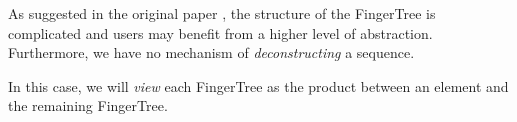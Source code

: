 \documentclass[12pt,twoside,notitlepage]{report}
\begin{document}
As suggested in the original paper \cite{fingertrees}, the structure of the FingerTree is complicated and users may benefit from a higher level of abstraction. Furthermore, we have no mechanism of \textit{deconstructing} a sequence.

In this case, we will \textit{view}\cite{wadler} each FingerTree as the product between an element and the remaining FingerTree. 

\begin{code}
\\
\\
\>  \AgdaSymbol{\{}\AgdaSymbol{\}(} \AgdaSymbol{:}  \AgdaSymbol{)(} \AgdaSymbol{:}  \AgdaSymbol{)}\<%
\\
\>[8]\<[10]%
\>[10]  \AgdaSymbol{:}   \<%
\\
\>[8]\<[10]%
\>[10]  \AgdaSymbol{:}     \AgdaSymbol{:}\<%
\\
\>[8]\<[10]%
\>[10]\AgdaSymbol{\{} \AgdaSymbol{:} \AgdaSymbol{\}}    \<%
\\
\>[0]\<[2]%
\>[2] \AgdaSymbol{:} \<[10]%
\>[10]   \AgdaSymbol{\{}\AgdaSymbol{\}}\<%
\\
\>[0]\<[2]%
\>[2] \AgdaSymbol{:}  \AgdaSymbol{\{}\AgdaSymbol{\}}\<%
\\
\>[2]\<[10]%
\>[10]\AgdaSymbol{(} \AgdaSymbol{:} \AgdaSymbol{)}\<%
\\
\>[2]\<[10]%
\>[10] \AgdaSymbol{(} \AgdaSymbol{:}    \AgdaSymbol{\{}\AgdaSymbol{\})}\<%
\\
\>[2]\<[10]%
\>[10]    \AgdaSymbol{\{}    \AgdaSymbol{\}}\<%
\\
\end{code} 
\end{document}
